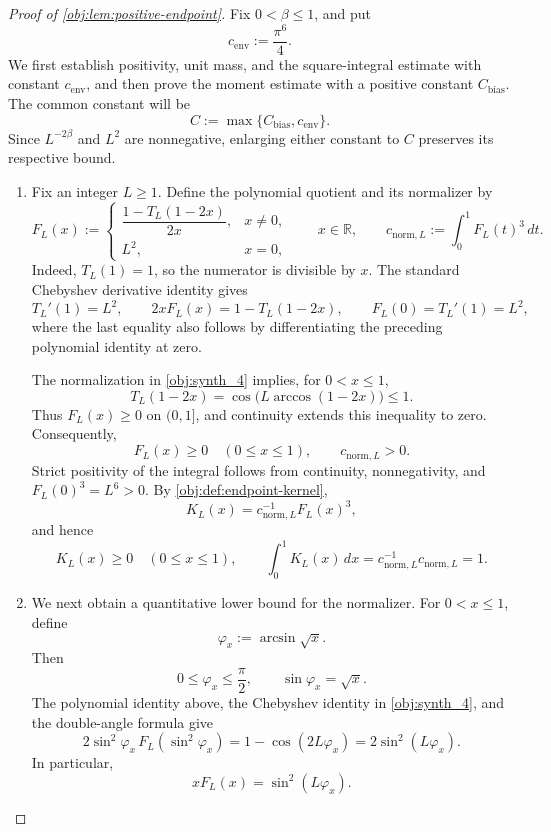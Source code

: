 \documentclass[11pt]{article}
\begin{document}
\begin{proof}[Proof of \cref{obj:lem:positive-endpoint}]
Fix \(0<\beta\le1\), and put
\[
c_{\mathrm{env}}:=\frac{\pi^6}{4}.
\]
We first establish positivity, unit mass, and the square-integral estimate with constant \(c_{\mathrm{env}}\), and then prove the moment estimate with a positive constant \(C_{\mathrm{bias}}\). The common constant will be
\[
C:=\max\{C_{\mathrm{bias}},c_{\mathrm{env}}\}.
\]
Since \(L^{-2\beta}\) and \(L^2\) are nonnegative, enlarging either constant to \(C\) preserves its respective bound.

\begin{enumerate}
\item Fix an integer \(L\ge1\). Define the polynomial quotient and its normalizer by
\[
F_L(x):=
\begin{cases}
\dfrac{1-T_L(1-2x)}{2x},&x\ne0,\\[6pt]
L^2,&x=0,
\end{cases}
\qquad x\in\mathbb R,
\qquad
c_{\mathrm{norm},L}:=\int_0^1 F_L(t)^3\,dt.
\]
Indeed, \(T_L(1)=1\), so the numerator is divisible by \(x\). The standard Chebyshev derivative identity gives
\[
T_L'(1)=L^2,
\qquad
2xF_L(x)=1-T_L(1-2x),
\qquad
F_L(0)=T_L'(1)=L^2,
\]
where the last equality also follows by differentiating the preceding polynomial identity at zero.

The normalization in \cref{obj:synth_4} implies, for \(0<x\le1\),
\[
T_L(1-2x)
=
\cos\!\bigl(L\arccos(1-2x)\bigr)
\le1.
\]
Thus \(F_L(x)\ge0\) on \((0,1]\), and continuity extends this inequality to zero. Consequently,
\[
F_L(x)\ge0\quad(0\le x\le1),
\qquad
c_{\mathrm{norm},L}>0.
\]
Strict positivity of the integral follows from continuity, nonnegativity, and \(F_L(0)^3=L^6>0\). By \cref{obj:def:endpoint-kernel},
\[
K_L(x)=c_{\mathrm{norm},L}^{-1}F_L(x)^3,
\]
and hence
\[
K_L(x)\ge0\quad(0\le x\le1),
\qquad
\int_0^1K_L(x)\,dx
=
c_{\mathrm{norm},L}^{-1}c_{\mathrm{norm},L}
=1.
\]

\item We next obtain a quantitative lower bound for the normalizer. For \(0<x\le1\), define
\[
\varphi_x:=\arcsin\sqrt{x}.
\]
Then
\[
0\le\varphi_x\le\frac{\pi}{2},
\qquad
\sin\varphi_x=\sqrt{x}.
\]
The polynomial identity above, the Chebyshev identity in \cref{obj:synth_4}, and the double-angle formula give
\[
2\sin^2\varphi_x\,F_L(\sin^2\varphi_x)
=
1-\cos(2L\varphi_x)
=
2\sin^2(L\varphi_x).
\]
In particular,
\[
xF_L(x)=\sin^2(L\varphi_x).
\]


\end{enumerate}
\end{proof}
\end{document}
